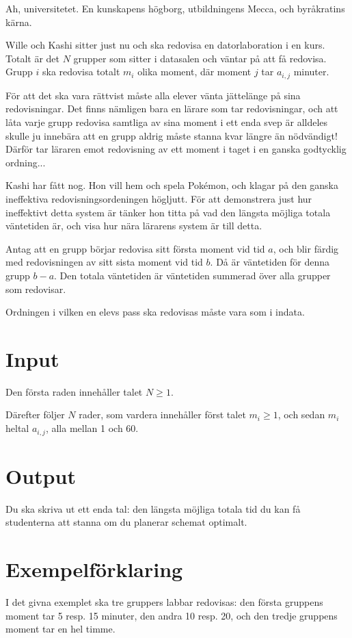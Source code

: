 
Ah, universitetet. En kunskapens högborg, utbildningens Mecca, och byråkratins kärna.

Wille och Kashi sitter just nu och ska redovisa en datorlaboration i en kurs. Totalt
är det $N$ grupper som sitter i datasalen och väntar på att få redovisa. Grupp $i$
ska redovisa totalt $m_i$ olika moment, där moment $j$ tar $a_{i, j}$ minuter.

För att det ska vara rättvist måste alla elever vänta jättelänge på sina redovisningar.
Det finns nämligen bara en lärare som tar redovisningar, och att låta varje grupp
redovisa samtliga av sina moment i ett enda svep är alldeles skulle ju innebära
att en grupp aldrig måste stanna kvar längre än nödvändigt! Därför tar läraren
emot redovisning av ett moment i taget i en ganska godtycklig ordning...

Kashi har fått nog. Hon vill hem och spela Pokémon, och klagar på den ganska
ineffektiva redovisningsordeningen högljutt. För att demonstrera just hur ineffektivt
detta system är tänker hon titta på vad den längsta möjliga totala väntetiden är,
och visa hur nära lärarens system är till detta.

Antag att en grupp börjar redovisa sitt första moment vid tid $a$, och
blir färdig med redovisningen av sitt sista moment vid tid $b$. Då är väntetiden
för denna grupp $b - a$. Den totala väntetiden är väntetiden summerad över alla
grupper som redovisar.

Ordningen i vilken en elevs pass ska redovisas måste vara som i indata.

\section*{Input}
Den första raden innehåller talet $N \ge 1$.

Därefter följer $N$ rader, som vardera innehåller först talet $m_i \ge 1$, och sedan $m_i$ heltal $a_{i,j}$, alla mellan 1 och 60.


\section*{Output}
Du ska skriva ut ett enda tal: den längsta möjliga totala tid du kan få studenterna att stanna om du planerar schemat optimalt.

\section*{Exempelförklaring}
I det givna exemplet ska tre gruppers labbar redovisas: den första gruppens moment tar 5 resp. 15 minuter, den andra 10 resp. 20, och den tredje gruppens moment tar en hel timme.

